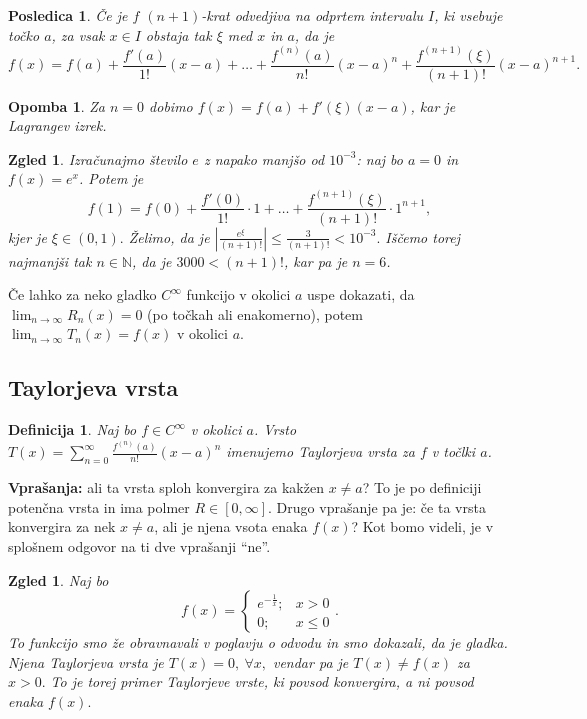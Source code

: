 \documentclass[10pt, a4paper]{article}
\newtheorem{posledica}[izr]{Posledica}
\newtheorem{defi}[izr]{Definicija}
\newenvironment{noticeB}{%
  \tcolorbox[%
  notitle,
  empty,
  enhanced,  %
  breakable,
  coltext=black,
  colback=white, 
  fontupper=\rmfamily,
  noparskip,
  sharp corners,
  boxrule=-1pt,  %
  frame hidden,
  left=7pt,  %
  right=7pt,
  top=5pt,
  bottom=5pt,
  before skip=2.5ex plus 2pt,
  after skip=2.5ex plus 2pt,
  borderline west = {1.5pt}{-0.1pt}{blue!30!black}, %
  overlay unbroken and last={%
    \draw[color=black, line width=1.25pt]
    ($(frame.south west)+(1.pt, -0.1pt)$) -- ++(2em, 0);
  }
  ]}
{\endtcolorbox}
\newenvironment{definicija}{\begin{noticeB}\begin{defi}}{%
\end{defi}\end{noticeB}}
\newtheorem*{opomba}{Opomba}
\newtheorem{zgled}[izr]{Zgled}
\newcommand{\N}{\mathbb {N}}
\newcommand{\limzap}[1]{\lim_{n \to \infty} {#1}}
\begin{document}
\begin{posledica}
    Če je $f$ $(n+1)$-krat odvedjiva na odprtem intervalu $I$, ki vsebuje točko $a$,
    za vsak $x \in I$ obstaja tak $\xi$ med $x$ in $a$, da je 
    $$f(x) = f(a) + \frac{f'(a)}{1!} (x-a) + \dots + \frac{f^{(n)}(a)}{n!} (x-a)^n + \frac{f^{(n+1)}(\xi)}{(n+1)!} (x-a)^{n+1}.$$
\end{posledica}

\begin{opomba}
    Za $n = 0$ dobimo $f(x) = f(a) + f'(\xi) (x-a)$, kar je Lagrangev izrek.
\end{opomba}

\begin{zgled}
    Izračunajmo število $e$ z napako manjšo od $10^{-3}$:
    naj bo $a = 0$ in $f(x) = e^x$. Potem je 
    $$f(1) = f(0) + \frac{f'(0)}{1!}\cdot 1 + \dots + \frac{f^{(n+1)}(\xi)}{(n+1)!} \cdot 1^{n+1},$$
    kjer je $\xi \in (0, 1).$
    Želimo, da je $\left| \frac{e^\xi}{(n+1)!} \right| \leq \frac{3}{(n+1)!} <10^{-3}.$
    Iščemo torej najmanjši tak $n \in \N$, da je $3000 < (n+1)!$, kar pa je $n = 6$.
\end{zgled}

Če lahko za neko gladko $C^\infty$ funkcijo v okolici $a$ uspe dokazati, da $\limzap{R_n(x)} = 0$ (po točkah ali enakomerno),
potem $\limzap{T_n (x)} = f(x)$ v okolici $a$.

\subsection{Taylorjeva vrsta}

\begin{definicija}
    Naj bo $f \in C^{\infty}$ v okolici $a$.
    Vrsto $T(x) = \sum_{n=0} ^\infty \frac{f^{(n)} (a)}{n!} (x-a)^n$
    imenujemo Taylorjeva vrsta za $f$ v točlki $a$.
\end{definicija}

\textbf{Vprašanja:} ali ta vrsta sploh konvergira za kakžen $x \neq a$?
To je po definiciji potenčna vrsta in ima polmer $R \in [0, \infty]$.
Drugo vprašanje pa je: če ta vrsta konvergira za nek $x \neq a$, ali je njena vsota enaka $f(x)$?
Kot bomo videli, je v splošnem odgovor na ti dve vprašanji "`ne"'.

\begin{zgled}
    Naj bo $$f(x) = \begin{cases}
        e^{-\frac{1}{x}}; & x > 0\\
        0; & x \leq 0
    \end{cases}.$$
    To funkcijo smo že obravnavali v poglavju o odvodu in smo dokazali, da je gladka.
    Njena Taylorjeva vrsta je $T(x) = 0,\ \forall x,$
    vendar pa je $T(x) \neq f(x)$ za $x > 0.$
    To je torej primer Taylorjeve vrste, ki povsod konvergira, a ni povsod enaka $f(x).$
\end{zgled}
\end{document}
